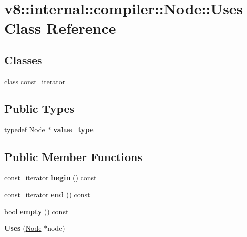 \hypertarget{classv8_1_1internal_1_1compiler_1_1Node_1_1Uses}{}\section{v8\+:\+:internal\+:\+:compiler\+:\+:Node\+:\+:Uses Class Reference}
\label{classv8_1_1internal_1_1compiler_1_1Node_1_1Uses}
\subsection*{Classes}
\begin{DoxyCompactItemize}
\item 
class \mbox{\hyperlink{classv8_1_1internal_1_1compiler_1_1Node_1_1Uses_1_1const__iterator}{const\+\_\+iterator}}
\end{DoxyCompactItemize}
\subsection*{Public Types}
\begin{DoxyCompactItemize}
\item 
\mbox{\label{classv8_1_1internal_1_1compiler_1_1Node_1_1Uses_a465033ad0ca06883e34e1e3a12a13666}} 
typedef \mbox{\hyperlink{classv8_1_1internal_1_1compiler_1_1Node}{Node}} $\ast$ {\bfseries value\+\_\+type}
\end{DoxyCompactItemize}
\subsection*{Public Member Functions}
\begin{DoxyCompactItemize}
\item 
\mbox{\label{classv8_1_1internal_1_1compiler_1_1Node_1_1Uses_aa720f51bb6b18aacb86d212fb1ee7144}} 
\mbox{\hyperlink{classv8_1_1internal_1_1compiler_1_1Node_1_1Uses_1_1const__iterator}{const\+\_\+iterator}} {\bfseries begin} () const
\item 
\mbox{\label{classv8_1_1internal_1_1compiler_1_1Node_1_1Uses_aba0b04d7aa29dae3edbd2ba11a35ce81}} 
\mbox{\hyperlink{classv8_1_1internal_1_1compiler_1_1Node_1_1Uses_1_1const__iterator}{const\+\_\+iterator}} {\bfseries end} () const
\item 
\mbox{\label{classv8_1_1internal_1_1compiler_1_1Node_1_1Uses_a557413eaf769858be413f7d19e6ce40d}} 
\mbox{\hyperlink{classbool}{bool}} {\bfseries empty} () const
\item 
\mbox{\label{classv8_1_1internal_1_1compiler_1_1Node_1_1Uses_a2b32cd8b099c41442d481618b43c607e}} 
{\bfseries Uses} (\mbox{\hyperlink{classv8_1_1internal_1_1compiler_1_1Node}{Node}} $\ast$node)
\end{DoxyCompactItemize}


